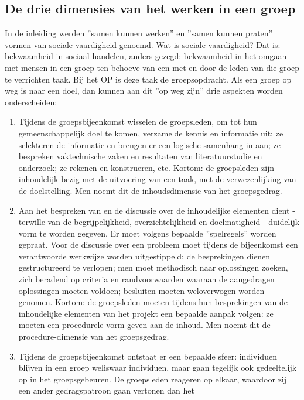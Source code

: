 \subsection{De drie dimensies van het werken in een groep}

In de inleiding werden ''samen kunnen werken'' en ''samen kunnen praten''
vormen van sociale vaardigheid genoemd.
Wat is sociale vaardigheid? Dat is: bekwaamheid in sociaal
handelen, anders gezegd: bekwaamheid in het omgaan met mensen
in een groep ten behoeve van een met en door de leden van die
groep te verrichten taak. Bij het OP is deze taak de groepsopdracht.
Als een groep op weg is naar een doel, dan kunnen aan dit ''op weg zijn''
drie aspekten worden onderscheiden:
\begin{enumerate}
\item
     Tijdens de groepsbijeenkomst wisselen de groepsleden, om
     tot hun gemeenschappelijk doel te komen, verzamelde kennis 
en informatie uit; ze selekteren de informatie en
     brengen er een logische samenhang in aan; ze bespreken
     vaktechnische zaken en resultaten van literatuurstudie en
     onderzoek; ze rekenen en konstrueren, etc.
     Kortom: de groepsleden zijn inhoudelijk bezig met de
     uitvoering van een taak, met de verwezenlijking van de
     doelstelling. Men noemt dit de inhoudsdimensie van het
     groepsgedrag.
\item
     Aan het bespreken van en de discussie over de inhoudelijke elementen dient - terwille van de begrijpelijkheid,
     overzichtelijkheid en doelmatigheid - duidelijk vorm te worden gegeven.
     Er moet volgens bepaalde ''spelregels'' worden gepraat.
     Voor de discussie over een probleem moet
     tijdens de bijeenkomst een verantwoorde werkwijze worden
     uitgestippeld; de bespre\-king\-en dienen gestructureerd te
     verlopen; men moet methodisch naar oplossingen zoeken,
     zich beradend op criteria en randvoorwaarden waaraan de
     aangedragen oplossingen moeten voldoen; besluiten moeten
     weloverwogen worden genomen.
     Kortom: de groepsleden moeten tijdens hun besprekingen
     van de inhoudelijke elementen van het projekt een bepaalde aanpak volgen: ze moeten een procedurele vorm geven
     aan de inhoud. Men noemt dit de procedure-dimensie van het
     groepsgedrag.
\item
     Tijdens de groepsbijeenkomst ontstaat er een bepaalde
     sfeer: individuen blijven in een groep weliswaar individuen, maar gaan tegelijk ook gedeeltelijk op in het
     groepsgebeuren. De groeps\-leden reageren op elkaar, waardoor zij een ander gedragspatroon gaan vertonen dan het

\end{enumerate}
